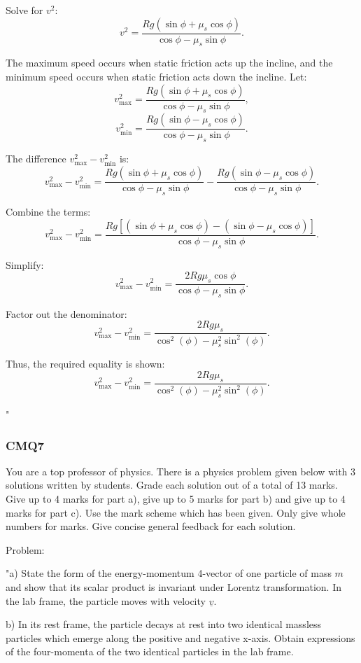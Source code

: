 Solve for $v^2$:
\[
v^2 = \frac{Rg (\sin\phi + \mu_s \cos\phi)}{\cos\phi - \mu_s \sin\phi}.
\]

The maximum speed occurs when static friction acts up the incline, and the minimum speed occurs when static friction acts down the incline. Let:
\[
v_{\text{max}}^2 = \frac{Rg (\sin\phi + \mu_s \cos\phi)}{\cos\phi - \mu_s \sin\phi},
\]
\[
v_{\text{min}}^2 = \frac{Rg (\sin\phi - \mu_s \cos\phi)}{\cos\phi - \mu_s \sin\phi}.
\]

The difference $v_{\text{max}}^2 - v_{\text{min}}^2$ is:
\[
v_{\text{max}}^2 - v_{\text{min}}^2 = \frac{Rg (\sin\phi + \mu_s \cos\phi)}{\cos\phi - \mu_s \sin\phi} - \frac{Rg (\sin\phi - \mu_s \cos\phi)}{\cos\phi - \mu_s \sin\phi}.
\]

Combine the terms:
\[
v_{\text{max}}^2 - v_{\text{min}}^2 = \frac{Rg [(\sin\phi + \mu_s \cos\phi) - (\sin\phi - \mu_s \cos\phi)]}{\cos\phi - \mu_s \sin\phi}.
\]

Simplify:
\[
v_{\text{max}}^2 - v_{\text{min}}^2 = \frac{2Rg \mu_s \cos\phi}{\cos\phi - \mu_s \sin\phi}.
\]

Factor out the denominator:
\[
v_{\text{max}}^2 - v_{\text{min}}^2 = \frac{2Rg\mu_s}{\cos^2(\phi) - \mu_s^2\sin^2(\phi)}.
\]

Thus, the required equality is shown:
\[
\boxed{v_{\text{max}}^2 - v_{\text{min}}^2 = \frac{2Rg\mu_s}{\cos^2(\phi) - \mu_s^2\sin^2(\phi)}}.
\]

"

\subsubsection{CMQ7}

You are a top professor of physics. There is a physics problem given below with 3 solutions written by students. Grade each solution out of a total of 13 marks. Give up to 4 marks for part a), give up to 5 marks for part b) and give up to 4 marks for part c). Use the mark scheme which has been given. Only give whole numbers for marks. Give concise general feedback for each solution.

Problem:

"a) State the form of the energy-momentum 4-vector of one particle of mass \( m \) and show that its scalar product is invariant under Lorentz transformation. In the lab frame, the particle moves with velocity \( \underline{v} \). 

b) In its rest frame, the particle decays at rest into two identical massless particles which emerge along the positive and negative x-axis. Obtain expressions of the four-momenta of the two identical particles in the lab frame. 
    
